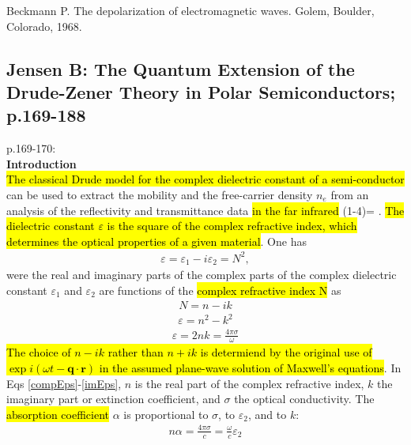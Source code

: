 \begin{thebibliography}{9}
      Beckmann P.
      The depolarization of electromagnetic waves.
      Golem, Boulder, Colorado, 1968.

\end{thebibliography}






\subsection{Jensen B: The Quantum Extension of the Drude-Zener Theory in Polar Semiconductors; p.169-188}
p.169-170:\\
\textbf{Introduction}\\
\hl{The classical Drude model for the complex dielectric constant of a semi-conductor} can be used to
extract the mobility and the free-carrier density $n_e$ from an analysis of the reflectivity and transmittance
data \hl{in the far infrared} (1-4)=
      \cite{Palik1979, Holm1977,Perkowitz1971,Perkowitz1974,Fan1967}.
\hl{The dielectric constant $\varepsilon$ is the square of the complex refractive
index, which determines the optical properties of a given material}. One has
\begin{align}
   \varepsilon = \varepsilon_1 - i \varepsilon_2 = N^2,
   \label{compEps}
\end{align}
were the real and imaginary parts of the complex  parts of the complex dielectric constant $\varepsilon_1$ 
and $\varepsilon_2$ are functions of the \hl{complex refractive index N} as
\begin{align}
   N = n -i k
\end{align}
\begin{align}
   \varepsilon = n^2 - k^2
\end{align}
\begin{align}
   \varepsilon = 2nk = \frac{4\pi \sigma}{\omega}
   \label{imEps}
\end{align}
\hl{The choice of $n-ik$ rather than $n+ik$ is determiend by the original use of 
$\exp i(\omega t - \boldsymbol q \cdot \boldsymbol r)$ in the assumed plane-wave solution of
Maxwell's equations}.
In Eqs \eqref{compEps}-\eqref{imEps}, $n$ is the real part of the complex refractive index, $k$
the imaginary part or extinction coefficient, and $\sigma$ the optical conductivity. The
\hl{absorption coefficient} $\alpha$ is proportional to $\sigma$, to $\varepsilon_2$, and to $k$:
\begin{align}
   n\alpha = \frac{4 \pi \sigma}{c} = \frac{\omega}{c} \varepsilon_2
\end{align}
